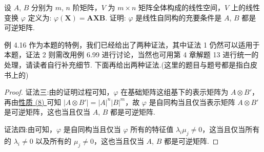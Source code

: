 \documentclass[../../main.tex]{subfiles}%
\begin{document}
\begin{example}
设 $A$, $B$ 分别为 $m$, $n$ 阶矩阵，$V$ 为 $m\times n$ 矩阵全体构成的线性空间，$V$ 上的线性变换 $\varphi$ 定义为: $\varphi(\boldsymbol{X}) = \boldsymbol{A}\boldsymbol{X}\boldsymbol{B}$. 证明: $\varphi$ 是线性自同构的充要条件是 $A$, $B$ 都是可逆矩阵.
\end{example}
\begin{remark}
例 4.16 作为本题的特例，我们已经给出了两种证法，其中证法 1 仍然可以适用于本题，证法 2 则需改用例 6.99 进行讨论，当然也可用第 4 章解题 13 进行统一的处理，请读者自行补充细节. 下面再给出两种证法.(这里的题目与题号都是指白皮书上的)
\end{remark}
\begin{proof}

{\color{blue}证法三:}由的证明过程可知，$\varphi$ 在基础矩阵这组基下的表示矩阵为 $A\otimes B'$，再由\hyperref[矩阵的Kronecker积的基本性质(8)]{性质 (8) }可知 $|A\otimes B'| = |A|^n|B|^m$，故 $\varphi$ 是自同构当且仅当表示矩阵 $A\otimes B'$ 是可逆矩阵，这也当且仅当 $A$, $B$ 都是可逆矩阵.

{\color{blue}证法四:}由可知，$\varphi$ 是自同构当且仅当 $\varphi$ 所有的特征值 $\lambda_i\mu_j\neq 0$，这当且仅当所有的 $\lambda_i\neq 0$ 以及所有的 $\mu_j\neq 0$，这也当且仅当 $A$, $B$ 都是可逆矩阵.
\end{proof}
\end{document}
